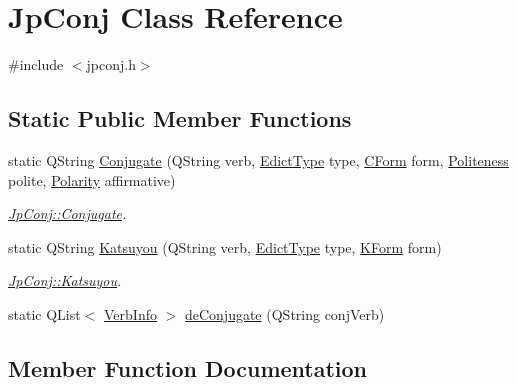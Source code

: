 \hypertarget{class_jp_conj}{}\section{Jp\+Conj Class Reference}
\label{class_jp_conj}


{\ttfamily \#include $<$jpconj.\+h$>$}

\subsection*{Static Public Member Functions}
\begin{DoxyCompactItemize}
\item 
static Q\+String \hyperlink{class_jp_conj_a85a93722d4f8df3bf0f7555559f66dcd}{Conjugate} (Q\+String verb, \hyperlink{type_defs_8h_a44f9030d5e119edcb703fea53ceb7a1b}{Edict\+Type} type, \hyperlink{type_defs_8h_af45f1339984167e7b556ced32eca2472}{C\+Form} form, \hyperlink{type_defs_8h_ab4f7d298d5c6d08f0a7cd0fdd1ac1f2e}{Politeness} polite, \hyperlink{type_defs_8h_a84a045fa4024e050ca8be6d33311a054}{Polarity} affirmative)
\begin{DoxyCompactList}\small\item\em \hyperlink{class_jp_conj_a85a93722d4f8df3bf0f7555559f66dcd}{Jp\+Conj\+::\+Conjugate}. \end{DoxyCompactList}\item 
static Q\+String \hyperlink{class_jp_conj_a4b04051abf112cede08db31f209fcee7}{Katsuyou} (Q\+String verb, \hyperlink{type_defs_8h_a44f9030d5e119edcb703fea53ceb7a1b}{Edict\+Type} type, \hyperlink{type_defs_8h_a0cdb0ab5f8f266dbb06760ee6b178cc3}{K\+Form} form)
\begin{DoxyCompactList}\small\item\em \hyperlink{class_jp_conj_a4b04051abf112cede08db31f209fcee7}{Jp\+Conj\+::\+Katsuyou}. \end{DoxyCompactList}\item 
static Q\+List$<$ \hyperlink{struct_verb_info}{Verb\+Info} $>$ \hyperlink{class_jp_conj_a04eea8c2871f9a4db32a567f09cc64b1}{de\+Conjugate} (Q\+String conj\+Verb)
\end{DoxyCompactItemize}


\subsection{Member Function Documentation}
